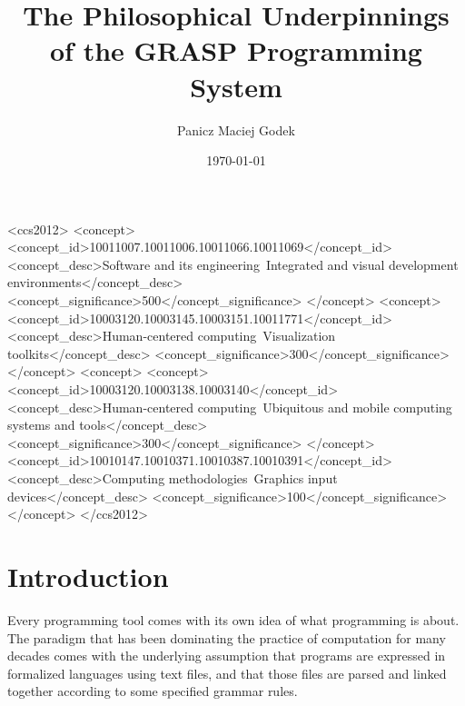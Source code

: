 \documentclass[acmsmall,nonacm]{acmart}
\author{Panicz Maciej Godek}
\date{\today}
\title{The Philosophical Underpinnings of the GRASP Programming System}
\begin{document}

\begin{abstract}

\end{abstract}

\begin{CCSXML}
  <ccs2012>
  <concept>
  <concept_id>10011007.10011006.10011066.10011069</concept_id>
  <concept_desc>Software and its engineering~Integrated and visual development environments</concept_desc>
  <concept_significance>500</concept_significance>
  </concept>
  <concept>
  <concept_id>10003120.10003145.10003151.10011771</concept_id>
  <concept_desc>Human-centered computing~Visualization toolkits</concept_desc>
  <concept_significance>300</concept_significance>
  </concept>
  <concept>
  <concept>
  <concept_id>10003120.10003138.10003140</concept_id>
  <concept_desc>Human-centered computing~Ubiquitous and mobile computing systems and tools</concept_desc>
  <concept_significance>300</concept_significance>
  </concept>
  <concept_id>10010147.10010371.10010387.10010391</concept_id>
  <concept_desc>Computing methodologies~Graphics input devices</concept_desc>
  <concept_significance>100</concept_significance>
  </concept>
  </ccs2012>
\end{CCSXML}


\keywords{}

\maketitle

\section{Introduction}

Every programming tool comes with its own idea of what
programming is about. The paradigm that has been dominating
the practice of computation for many decades comes with
the underlying assumption that programs are expressed
in formalized languages using text files, and that those
files are parsed and linked together according to some
specified grammar rules.
\end{document}
